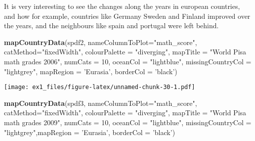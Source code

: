 \documentclass[]{article}
\newenvironment{Shaded}{\begin{snugshade}}{\end{snugshade}}
\newcommand{\KeywordTok}[1]{\textcolor[rgb]{0.13,0.29,0.53}{\textbf{#1}}}
\newcommand{\DataTypeTok}[1]{\textcolor[rgb]{0.13,0.29,0.53}{#1}}
\newcommand{\DecValTok}[1]{\textcolor[rgb]{0.00,0.00,0.81}{#1}}
\newcommand{\StringTok}[1]{\textcolor[rgb]{0.31,0.60,0.02}{#1}}
\newcommand{\CommentTok}[1]{\textcolor[rgb]{0.56,0.35,0.01}{\textit{#1}}}
\newcommand{\OperatorTok}[1]{\textcolor[rgb]{0.81,0.36,0.00}{\textbf{#1}}}
\newcommand{\NormalTok}[1]{#1}
\begin{document}
\begin{Shaded}
\end{Shaded}

It is very interesting to see the changes along the years in european
countries, and how for example, countries like Germany Sweden and
Finland improved over the years, and the neighbours like spain and
portugal were left behind.

\begin{Shaded}
\begin{Highlighting}[]
\KeywordTok{mapCountryData}\NormalTok{(spdf2, }\DataTypeTok{nameColumnToPlot=}\StringTok{"math_score"}\NormalTok{, }\DataTypeTok{catMethod=}\StringTok{"fixedWidth"}\NormalTok{, }\DataTypeTok{colourPalette =} \StringTok{"diverging"}\NormalTok{, }\DataTypeTok{mapTitle =} \StringTok{"World Pisa math grades 2006"}\NormalTok{,  }\DataTypeTok{numCats =} \DecValTok{10}\NormalTok{, }\DataTypeTok{oceanCol =} \StringTok{"lightblue"}\NormalTok{, }\DataTypeTok{missingCountryCol =} \StringTok{"lightgrey"}\NormalTok{, }\DataTypeTok{mapRegion =} \StringTok{'Eurasia'}\NormalTok{, }\DataTypeTok{borderCol =} \StringTok{'black'}\NormalTok{)}
\end{Highlighting}
\end{Shaded}

\texttt{[image: ex1\_files/figure-latex/unnamed-chunk-30-1.pdf]}

\begin{Shaded}
\begin{Highlighting}[]
\KeywordTok{mapCountryData}\NormalTok{(spdf3, }\DataTypeTok{nameColumnToPlot=}\StringTok{"math_score"}\NormalTok{, }\DataTypeTok{catMethod=}\StringTok{"fixedWidth"}\NormalTok{, }\DataTypeTok{colourPalette =} \StringTok{"diverging"}\NormalTok{, }\DataTypeTok{mapTitle =} \StringTok{"World Pisa math grades 2009"}\NormalTok{, }\DataTypeTok{numCats =} \DecValTok{10}\NormalTok{, }\DataTypeTok{oceanCol =} \StringTok{"lightblue"}\NormalTok{, }\DataTypeTok{missingCountryCol =} \StringTok{"lightgrey"}\NormalTok{,}\DataTypeTok{mapRegion =} \StringTok{'Eurasia'}\NormalTok{, }\DataTypeTok{borderCol =} \StringTok{'black'}\NormalTok{)}
\end{Highlighting}
\end{Shaded}
\end{document}
